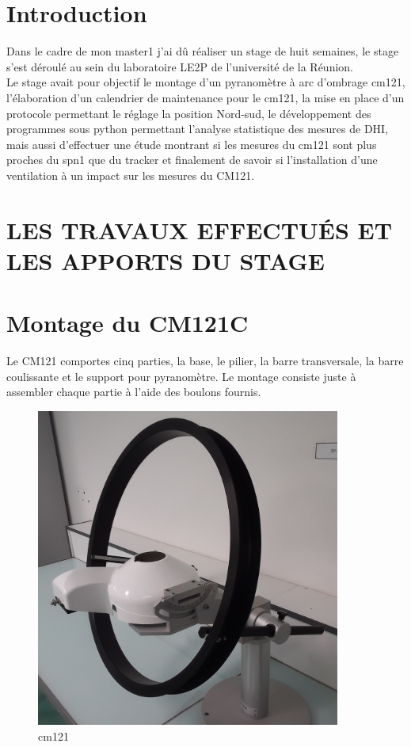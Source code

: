 \documentclass[12pt,a4paper]{article}
\begin{document}
\begin{flushleft}
\sf
\section*{Introduction}
%
\setcounter{page}{1}

Dans le cadre de mon master1 j'ai dû réaliser un stage de huit semaines, le stage s'est déroulé au sein du laboratoire LE2P de l'université de la Réunion.\\

Le stage avait pour objectif le montage d'un pyranomètre à arc d'ombrage cm121, l'élaboration d'un calendrier de maintenance pour le cm121, la mise en place d'un protocole permettant le réglage la position Nord-sud, le développement des programmes sous python permettant l'analyse statistique des mesures de DHI, mais aussi d'effectuer une étude montrant si les mesures du cm121 sont plus proches du spn1 que du tracker et finalement de savoir si l'installation d'une ventilation à un impact sur les mesures du CM121.
 

\section{}
 
\section{LES TRAVAUX EFFECTUÉS ET LES APPORTS DU STAGE}



\section{Montage du CM121C}

Le CM121 comportes cinq parties, la base, le pilier, la barre transversale, la barre coulissante et le support pour pyranomètre. Le montage consiste juste à assembler chaque partie à l'aide des boulons fournis.

\begin{figure}[H]
\centering
\includegraphics[width=10cm]{image/montage/1.jpg} 
\caption{cm121}
\end{figure}


\end{flushleft}
\end{document}
